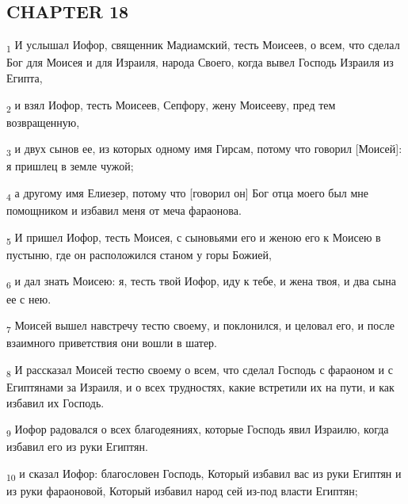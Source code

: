 \subsection{CHAPTER 18}
\begin{tcolorbox}
\textsubscript{1} И услышал Иофор, священник Мадиамский, тесть Моисеев, о всем, что сделал Бог для Моисея и для Израиля, народа Своего, когда вывел Господь Израиля из Египта,
\end{tcolorbox}
\begin{tcolorbox}
\textsubscript{2} и взял Иофор, тесть Моисеев, Сепфору, жену Моисееву, пред тем возвращенную,
\end{tcolorbox}
\begin{tcolorbox}
\textsubscript{3} и двух сынов ее, из которых одному имя Гирсам, потому что говорил [Моисей]: я пришлец в земле чужой;
\end{tcolorbox}
\begin{tcolorbox}
\textsubscript{4} а другому имя Елиезер, потому что [говорил он] Бог отца моего был мне помощником и избавил меня от меча фараонова.
\end{tcolorbox}
\begin{tcolorbox}
\textsubscript{5} И пришел Иофор, тесть Моисея, с сыновьями его и женою его к Моисею в пустыню, где он расположился станом у горы Божией,
\end{tcolorbox}
\begin{tcolorbox}
\textsubscript{6} и дал знать Моисею: я, тесть твой Иофор, иду к тебе, и жена твоя, и два сына ее с нею.
\end{tcolorbox}
\begin{tcolorbox}
\textsubscript{7} Моисей вышел навстречу тестю своему, и поклонился, и целовал его, и после взаимного приветствия они вошли в шатер.
\end{tcolorbox}
\begin{tcolorbox}
\textsubscript{8} И рассказал Моисей тестю своему о всем, что сделал Господь с фараоном и с Египтянами за Израиля, и о всех трудностях, какие встретили их на пути, и как избавил их Господь.
\end{tcolorbox}
\begin{tcolorbox}
\textsubscript{9} Иофор радовался о всех благодеяниях, которые Господь явил Израилю, когда избавил его из руки Египтян.
\end{tcolorbox}
\begin{tcolorbox}
\textsubscript{10} и сказал Иофор: благословен Господь, Который избавил вас из руки Египтян и из руки фараоновой, Который избавил народ сей из-под власти Египтян;
\end{tcolorbox}
